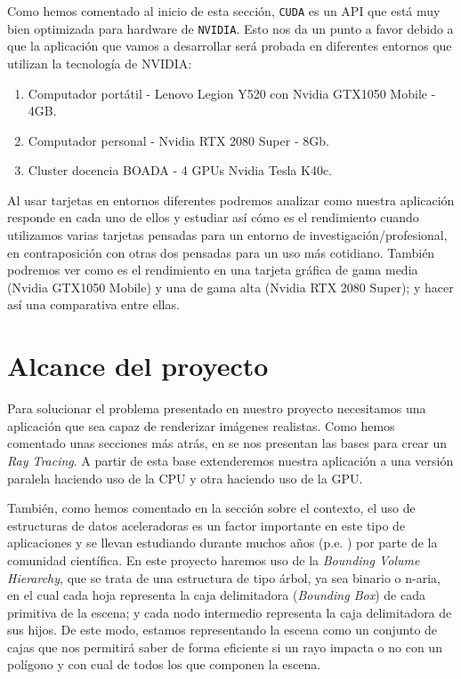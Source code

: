 \documentclass[titlepage,12pt]{report}
\begin{document}
Como hemos comentado al inicio de esta sección, \texttt{CUDA} es un API que está muy bien optimizada para hardware de \texttt{NVIDIA}. Esto nos da un punto a favor debido a que la aplicación que vamos a desarrollar será probada en diferentes entornos que utilizan la tecnología de NVIDIA:

\begin{enumerate}
	\item Computador portátil - Lenovo Legion Y520 con Nvidia GTX1050 Mobile - 4GB.
	\item Computador personal - Nvidia RTX 2080 Super - 8Gb.
	\item Cluster docencia BOADA - 4 GPUs Nvidia Tesla K40c.
\end{enumerate}

Al usar tarjetas en entornos diferentes podremos analizar como nuestra aplicación responde en cada uno de ellos y estudiar así cómo es el rendimiento cuando utilizamos varias tarjetas pensadas para un entorno de investigación/profesional, en contraposición con otras dos pensadas para un uso más cotidiano. También podremos ver como es el rendimiento en una tarjeta gráfica de gama media (Nvidia GTX1050 Mobile) y una de gama alta (Nvidia RTX 2080 Super); y hacer así una comparativa entre ellas.

\section{Alcance del proyecto}

Para solucionar el problema presentado en nuestro proyecto necesitamos una aplicación que sea capaz de renderizar imágenes realistas. Como hemos comentado unas secciones más atrás, en \citep{ShirleyRTA, ShirleyRTB, ShirleyRTC} se nos presentan las bases para crear un \textit{Ray Tracing}. A partir de esta base extenderemos nuestra aplicación a una versión paralela haciendo uso de la CPU y otra haciendo uso de la GPU.

También, como hemos comentado en la sección sobre el contexto, el uso de estructuras de datos aceleradoras es un factor importante en este tipo de aplicaciones y se llevan estudiando durante muchos años (p.e. \citep{Rubin1980}) por parte de la comunidad científica. En este proyecto haremos uso de la \textit{Bounding Volume Hierarchy}, que se trata de una estructura de tipo árbol, ya sea binario o n-aria, en el cual cada hoja representa la caja delimitadora (\textit{Bounding Box}) de cada primitiva de la escena; y cada nodo intermedio representa la caja delimitadora de sus hijos. De este modo, estamos representando la escena como un conjunto de cajas que nos permitirá saber de forma eficiente si un rayo impacta o no con un polígono y con cual de todos los que componen la escena.
\end{document}
